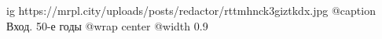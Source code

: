  
 
 
 
 

\ifcmt
  ig https://mrpl.city/uploads/posts/redactor/rttmhnck3giztkdx.jpg
	@caption Вход. 50-е годы
  @wrap center
  @width 0.9
\fi
